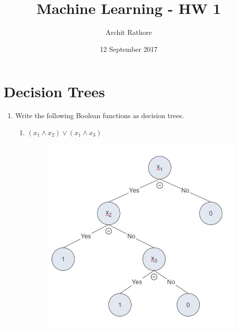 \documentclass{article}
\title{Machine Learning - HW 1}
\author{Archit Rathore}
\date{12 September 2017}
\begin{document}
\maketitle

\section{Decision Trees}

\begin{enumerate}
    \item Write the following Boolean functions as decision trees.
    \begin{enumerate}
        \item $(x_1\wedge x_2)\vee (x_1 \wedge x_3)$
        \begin{figure}[H]
            \centering
            \includegraphics{figures/dec_tree_1_a}
        \end{figure}
        

\end{enumerate}
\end{enumerate}
\end{document}
